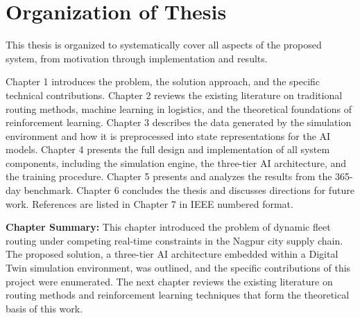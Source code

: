 \section{Organization of Thesis}

This thesis is organized to systematically cover all aspects of the proposed
system, from motivation through implementation and results.

Chapter 1 introduces the problem, the solution approach, and the specific
technical contributions. Chapter 2 reviews the existing literature on traditional
routing methods, machine learning in logistics, and the theoretical foundations of
reinforcement learning. Chapter 3 describes the data generated by the simulation
environment and how it is preprocessed into state representations for the AI
models. Chapter 4 presents the full design and implementation of all system
components, including the simulation engine, the three-tier AI architecture, and
the training procedure. Chapter 5 presents and analyzes the results from the
365-day benchmark. Chapter 6 concludes the thesis and discusses directions for
future work. References are listed in Chapter 7 in IEEE numbered format.

\vspace{1cm}
\noindent \textbf{Chapter Summary:} This chapter introduced the problem of dynamic
fleet routing under competing real-time constraints in the Nagpur city supply chain.
The proposed solution, a three-tier AI architecture embedded within a Digital Twin
simulation environment, was outlined, and the specific contributions of this project
were enumerated. The next chapter reviews the existing literature on routing methods
and reinforcement learning techniques that form the theoretical basis of this work.
